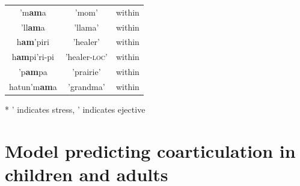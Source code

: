 \documentclass[a4paper,man,floatsintext,natbib,donotrepeattitle, apacite]{apa6}
\begin{document}
\begin{table}
\begin{tabular}{c | c| c}
\hline

\footnotesize{\textsf{'}m\textbf{am}a} & 'mom' & within \\
\footnotesize{\textsf{'}ll\textbf{am}a} & 'llama' & within \\
\footnotesize{h\textbf{am}\textsf{'}piri} & 'healer' & within \\
\footnotesize{h\textbf{am}pi\textsf{'}ri-pi} & 'healer-\textsc{loc}' & within \\
\footnotesize{\textsf{'}p\textbf{am}pa} & 'prairie' & within \\
\footnotesize{hatun\textsf{'}m\textbf{am}a} & 'grandma' & within \\

 \hline
\end{tabular}\par
\smallskip
* ' indicates stress, \textsf{'} indicates ejective\par
\smallskip
\end{table}

\section{Model predicting coarticulation in children and adults}\label{app:app-D}
\end{document}
